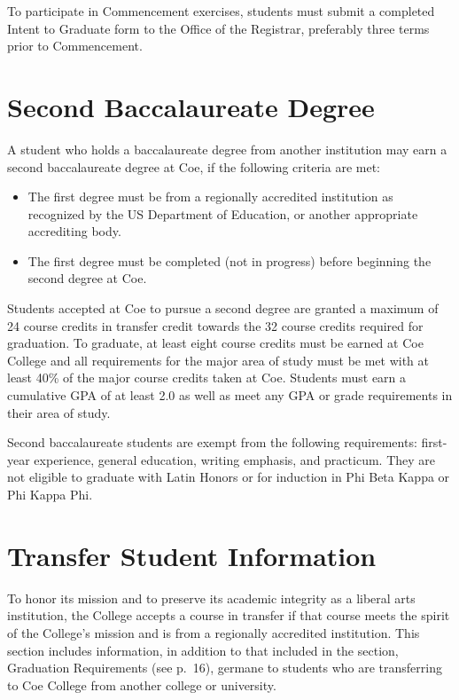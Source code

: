 \documentclass[
  letterpaper,
]{scrbook}
\providecommand{\tightlist}{%
  \setlength{\itemsep}{0pt}\setlength{\parskip}{0pt}}
\begin{document}
To participate in Commencement exercises, students must submit a
completed Intent to Graduate form to the Office of the Registrar,
preferably three terms prior to Commencement.

\hypertarget{second-baccalaureate-degree}{%
\section{Second Baccalaureate
Degree}\label{second-baccalaureate-degree}}

A student who holds a baccalaureate degree from another institution may
earn a second baccalaureate degree at Coe, if the following criteria are
met:

\begin{itemize}
\tightlist
\item
  The first degree must be from a regionally accredited institution as
  recognized by the US Department of Education, or another appropriate
  accrediting body.
\item
  The first degree must be completed (not in progress) before beginning
  the second degree at Coe.
\end{itemize}

Students accepted at Coe to pursue a second degree are granted a maximum
of 24 course credits in transfer credit towards the 32 course credits
required for graduation. To graduate, at least eight course credits must
be earned at Coe College and all requirements for the major area of
study must be met with at least 40\% of the major course credits taken
at Coe. Students must earn a cumulative GPA of at least 2.0 as well as
meet any GPA or grade requirements in their area of study.

Second baccalaureate students are exempt from the following
requirements: first-year experience, general education, writing
emphasis, and practicum. They are not eligible to graduate with Latin
Honors or for induction in Phi Beta Kappa or Phi Kappa Phi.

\hypertarget{transfer-student-information}{%
\section{Transfer Student
Information}\label{transfer-student-information}}

To honor its mission and to preserve its academic integrity as a liberal
arts institution, the College accepts a course in transfer if that
course meets the spirit of the College's mission and is from a
regionally accredited institution. This section includes information, in
addition to that included in the section, Graduation Requirements (see
p.~16), germane to students who are transferring to Coe College from
another college or university.
\end{document}
